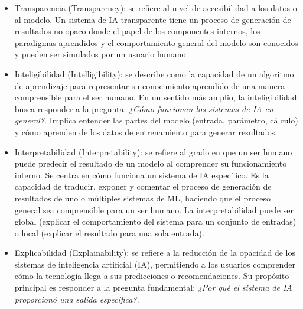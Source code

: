 \begin{itemize}
    \item Transparencia (Transparency): se refiere al nivel de accesibilidad a los datos o al modelo. Un sistema de IA transparente tiene un proceso de generación de resultados no opaco donde el papel de los componentes internos, los paradigmas aprendidos y el comportamiento general del modelo son conocidos y pueden ser simulados por un usuario humano.
    \item Inteligibilidad (Intelligibility): se describe como la capacidad de un algoritmo de aprendizaje para representar su conocimiento aprendido de una manera comprensible para el ser humano. En un sentido más amplio, la inteligibilidad busca responder a la pregunta: \textit{¿Cómo funcionan los sistemas de IA en general?}. Implica entender las partes del modelo (entrada, parámetro, cálculo) y cómo aprenden de los datos de entrenamiento para generar resultados.
    \item Interpretabilidad (Interpretability): se refiere al grado en que un ser humano puede predecir el resultado de un modelo al comprender su funcionamiento interno. Se centra en cómo funciona un sistema de IA específico. Es la capacidad de traducir, exponer y comentar el proceso de generación de resultados de uno o múltiples sistemas de ML, haciendo que el proceso general sea comprensible para un ser humano. La interpretabilidad puede ser global (explicar el comportamiento del sistema para un conjunto de entradas) o local (explicar el resultado para una sola entrada).
    \item  Explicabilidad (Explainability): se refiere a la reducción de la opacidad de los sistemas de inteligencia artificial (IA), permitiendo a los usuarios comprender cómo la tecnología llega a sus predicciones o recomendaciones. Su propósito principal es responder a la pregunta fundamental: \textit{¿Por qué el sistema de IA proporcionó una salida específica?}.
\end{itemize}

